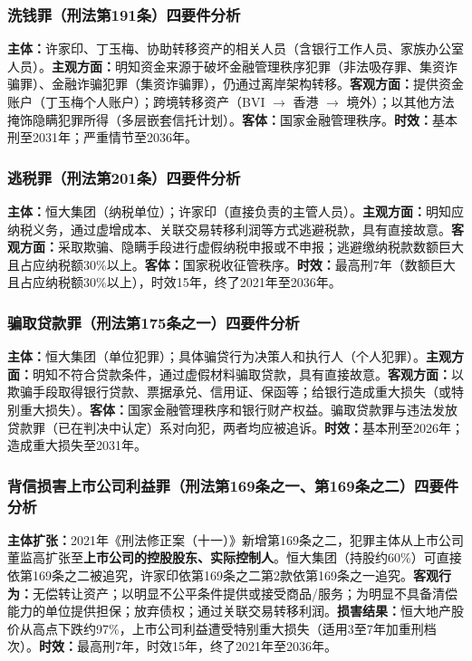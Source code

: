 \documentclass[11pt,a4paper,oneside,openany]{article}
\begin{document}
\subsubsection{洗钱罪（刑法第191条）四要件分析}
\textbf{主体：}许家印、丁玉梅、协助转移资产的相关人员（含银行工作人员、家族办公室人员）。\textbf{主观方面：}明知资金来源于破坏金融管理秩序犯罪（非法吸存罪、集资诈骗罪）、金融诈骗犯罪（集资诈骗罪），仍通过离岸架构转移。\textbf{客观方面：}提供资金账户（丁玉梅个人账户）；跨境转移资产（BVI $\rightarrow$ 香港 $\rightarrow$ 境外）；以其他方法掩饰隐瞒犯罪所得（多层嵌套信托计划）。\textbf{客体：}国家金融管理秩序。\textbf{时效：}基本刑至2031年；严重情节至2036年。

\subsubsection{逃税罪（刑法第201条）四要件分析}
\textbf{主体：}恒大集团（纳税单位）；许家印（直接负责的主管人员）。\textbf{主观方面：}明知应纳税义务，通过虚增成本、关联交易转移利润等方式逃避税款，具有直接故意。\textbf{客观方面：}采取欺骗、隐瞒手段进行虚假纳税申报或不申报；逃避缴纳税款数额巨大且占应纳税额30\%以上。\textbf{客体：}国家税收征管秩序。\textbf{时效：}最高刑7年（数额巨大且占应纳税额30\%以上），时效15年，终了2021年至2036年。

\subsubsection{骗取贷款罪（刑法第175条之一）四要件分析}
\textbf{主体：}恒大集团（单位犯罪）；具体骗贷行为决策人和执行人（个人犯罪）。\textbf{主观方面：}明知不符合贷款条件，通过虚假材料骗取贷款，具有直接故意。\textbf{客观方面：}以欺骗手段取得银行贷款、票据承兑、信用证、保函等；给银行造成重大损失（或特别重大损失）。\textbf{客体：}国家金融管理秩序和银行财产权益。骗取贷款罪与违法发放贷款罪（已在判决中认定）系对向犯，两者均应被追诉。\textbf{时效：}基本刑至2026年；造成重大损失至2031年。

\subsubsection{背信损害上市公司利益罪（刑法第169条之一、第169条之二）四要件分析}
\textbf{主体扩张：}2021年《刑法修正案（十一）》新增第169条之二，犯罪主体从上市公司董监高扩张至\textbf{上市公司的控股股东、实际控制人}。恒大集团（持股约60\%）可直接依第169条之二被追究，许家印依第169条之二第2款依第169条之一追究。\textbf{客观行为：}无偿转让资产；以明显不公平条件提供或接受商品/服务；为明显不具备清偿能力的单位提供担保；放弃债权；通过关联交易转移利润。\textbf{损害结果：}恒大地产股价从高点下跌约97\%，上市公司利益遭受特别重大损失（适用3至7年加重刑档次）。\textbf{时效：}最高刑7年，时效15年，终了2021年至2036年。
\end{document}
